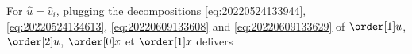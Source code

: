 For $\hat{u} = \hat{v}_i$, plugging the decompositions \eqref{eq:20220524133944}, \eqref{eq:20220524134613},
\eqref{eq:20220609133608} and \eqref{eq:20220609133629} of $\order[1]u$, $\order[2]u$, $\order[0]x $ et $\order[1]x$
delivers
